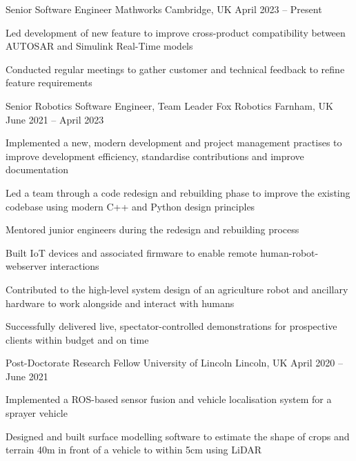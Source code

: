 \documentclass[11pt,a4paper]{awesome-cv}        %
\begin{document}
\makecvheader



\begin{cventries}
  \cventry
  {Senior Software Engineer}
  {Mathworks}
  {Cambridge, UK}
  {April 2023 -- Present}
  {
    \begin{cvitems}
      \item Led development of new feature to improve cross-product compatibility between AUTOSAR and Simulink Real-Time models
      \item Conducted regular meetings to gather customer and technical feedback to refine feature requirements
    \end{cvitems}
  }
  \cventry
  {Senior Robotics Software Engineer, Team Leader}
  {Fox Robotics}
  {Farnham, UK}
  {June 2021 -- April 2023}
  {
    \begin{cvitems}
      \item Implemented a new, modern development and project management practises to improve development efficiency, standardise contributions and improve documentation
      \item Led a team through a code redesign and rebuilding phase to improve the existing codebase using modern C++ and Python design principles
      \item Mentored junior engineers during the redesign and rebuilding process
      \item Built IoT devices and associated firmware to enable remote human-robot-webserver interactions
      \item Contributed to the high-level system design of an agriculture robot and ancillary hardware to work alongside and interact with humans
      \item Successfully delivered live, spectator-controlled demonstrations for prospective clients within budget and on time
    \end{cvitems}
  }
  \cventry
  {Post-Doctorate Research Fellow}
  {University of Lincoln}
  {Lincoln, UK}
  {April 2020 -- June 2021}
  {
    \begin{cvitems}
      \item Implemented a ROS-based sensor fusion and vehicle localisation system for a sprayer vehicle
      \item Designed and built surface modelling software to estimate the shape of crops and terrain 40m in front of a vehicle to within 5cm using LiDAR

\end{cvitems}}
\end{cventries}
\end{document}
